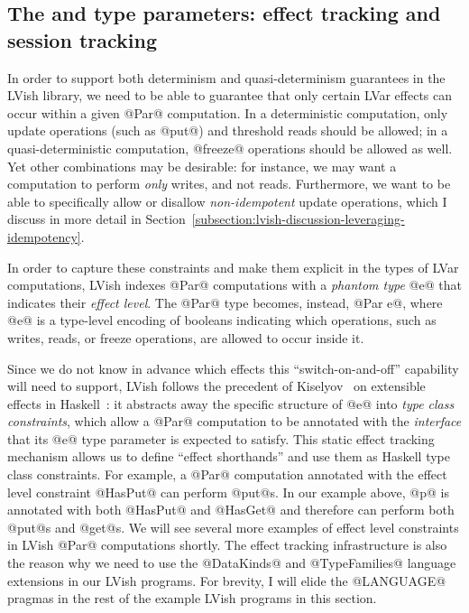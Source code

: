 \subsection{The  and  type parameters: effect tracking and session tracking}

In order to support both determinism and quasi-determinism guarantees
in the LVish library, we need to be able to guarantee that only
certain LVar effects can occur within a given @Par@ computation.  In a
deterministic computation, only update operations (such as @put@) and
threshold reads should be allowed; in a quasi-deterministic
computation, @freeze@ operations should be allowed as well.  Yet other
combinations may be desirable: for instance, we may want a computation
to perform \emph{only} writes, and not reads.  Furthermore, we want to
be able to specifically allow or disallow \emph{non-idempotent} update
operations, which I discuss in more detail in
Section~\ref{subsection:lvish-discussion-leveraging-idempotency}.

In order to capture these constraints and make them explicit in the
types of LVar computations, LVish indexes @Par@ computations with a
\emph{phantom type} @e@ that indicates their \emph{effect level}.  The
@Par@ type becomes, instead, @Par e@, where @e@ is a type-level
encoding of booleans indicating which operations, such as writes,
reads, or freeze operations, are allowed to occur inside it.

Since we do not know in advance which effects this
``switch-on-and-off'' capability will need to support, LVish follows
the precedent of Kiselyov \etal~on extensible effects in
Haskell~\cite{oleg-amr-haskell-2013}: it abstracts away the specific
structure of @e@ into \emph{type class constraints}, which allow a
@Par@ computation to be annotated with the \emph{interface} that its
@e@ type parameter is expected to satisfy.  This static effect
tracking mechanism allows us to define ``effect shorthands'' and use
them as Haskell type class constraints.  For example, a @Par@
computation annotated with the effect level constraint @HasPut@ can
perform @put@s.  In our example above, @p@ is annotated with both
@HasPut@ and @HasGet@ and therefore can perform both @put@s and
@get@s.  We will see several more examples of effect level constraints
in LVish @Par@ computations shortly.  The effect tracking
infrastructure is also the reason why we need to use the @DataKinds@
and @TypeFamilies@ language extensions in our LVish programs.  For
brevity, I will elide the @LANGUAGE@ pragmas in the rest of the
example LVish programs in this section.  

